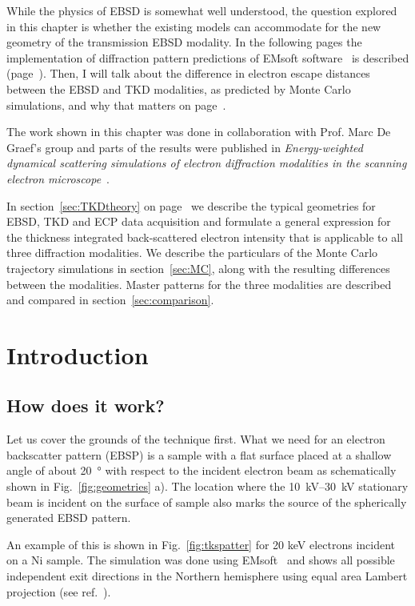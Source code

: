 While the physics of EBSD is somewhat well understood, the question explored in this chapter is whether the existing models can accommodate for the new geometry of the transmission EBSD modality. In the following pages the implementation of diffraction pattern predictions of EMsoft software~\cite{EMsoftpaper} is described (page~\pageref{sec:TKDtheory}). Then, I will talk about the difference in electron escape distances between the EBSD and TKD modalities, as predicted by Monte Carlo simulations, and why that matters on page~\pageref{sec:MC}. 


The work shown in this chapter was done in collaboration with Prof. Marc De Graef's group and parts of the results were published in \textit{Energy-weighted dynamical scattering simulations of electron diffraction modalities in the scanning electron microscope}~\cite{PascalTKD}.

In section~\ref{sec:TKDtheory} on page~\pageref{sec:TKDtheory} we describe the typical geometries for EBSD, TKD and ECP data acquisition and formulate a general expression for the thickness integrated back-scattered electron intensity that is applicable to all three diffraction modalities. We describe the particulars of the Monte Carlo trajectory simulations in section~\ref{sec:MC}, along with the resulting differences between the modalities. Master patterns for the three modalities are described and compared in section~\ref{sec:comparison}. 



\section{Introduction}

\subsection{How does it work?}
\label{sec:EBSD}

Let us cover the grounds of the technique first. What we need for an electron backscatter pattern (EBSP) is a sample with a flat surface placed at a shallow angle of about \SI{20}{\degree} with respect to the incident electron  beam as schematically shown in Fig.~\ref{fig:geometries} a). The location where the \SIrange{10}{30}{\kilo \volt} stationary beam is incident on  the surface of sample also marks the source of the spherically generated EBSD pattern. 

An example of this is shown in Fig.~\ref{fig:tkspatter} for 20 keV electrons incident on a Ni sample. The simulation was done using EMsoft~\cite{EMsoft} and shows all possible independent exit directions in the Northern hemisphere using equal area Lambert projection (see ref.~\cite{degraef2013e}). 

